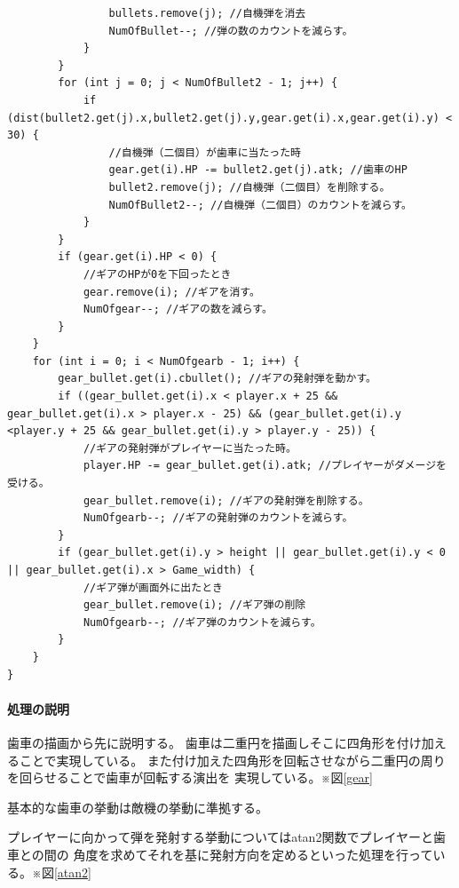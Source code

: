 \documentclass[a4paper,titlepage,11pt]{ltjsarticle}
\begin{document}
\begin{lstlisting}
                bullets.remove(j); //自機弾を消去
                NumOfBullet--; //弾の数のカウントを減らす。
            }
        }
        for (int j = 0; j < NumOfBullet2 - 1; j++) {
            if (dist(bullet2.get(j).x,bullet2.get(j).y,gear.get(i).x,gear.get(i).y) < 30) {
                //自機弾（二個目）が歯車に当たった時
                gear.get(i).HP -= bullet2.get(j).atk; //歯車のHP
                bullet2.remove(j); //自機弾（二個目）を削除する。
                NumOfBullet2--; //自機弾（二個目）のカウントを減らす。
            }
        }
        if (gear.get(i).HP < 0) {
            //ギアのHPが0を下回ったとき
            gear.remove(i); //ギアを消す。
            NumOfgear--; //ギアの数を減らす。
        }
    }
    for (int i = 0; i < NumOfgearb - 1; i++) {
        gear_bullet.get(i).cbullet(); //ギアの発射弾を動かす。
        if ((gear_bullet.get(i).x < player.x + 25 && gear_bullet.get(i).x > player.x - 25) && (gear_bullet.get(i).y <player.y + 25 && gear_bullet.get(i).y > player.y - 25)) {
            //ギアの発射弾がプレイヤーに当たった時。
            player.HP -= gear_bullet.get(i).atk; //プレイヤーがダメージを受ける。
            gear_bullet.remove(i); //ギアの発射弾を削除する。
            NumOfgearb--; //ギアの発射弾のカウントを減らす。
        }
        if (gear_bullet.get(i).y > height || gear_bullet.get(i).y < 0 || gear_bullet.get(i).x > Game_width) {
            //ギア弾が画面外に出たとき
            gear_bullet.remove(i); //ギア弾の削除
            NumOfgearb--; //ギア弾のカウントを減らす。
        }
    }
}
\end{lstlisting}
\paragraph{処理の説明}
歯車の描画から先に説明する。
歯車は二重円を描画しそこに四角形を付け加えることで実現している。
また付け加えた四角形を回転させながら二重円の周りを回らせることで歯車が回転する演出を
実現している。※図\ref{gear}

基本的な歯車の挙動は敵機の挙動に準拠する。

プレイヤーに向かって弾を発射する挙動についてはatan2関数でプレイヤーと歯車との間の
角度を求めてそれを基に発射方向を定めるといった処理を行っている。※図\ref{atan2}
\end{document}
